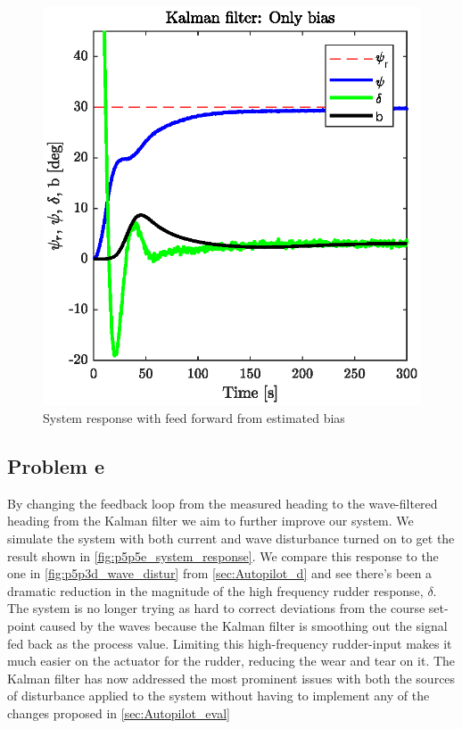 \begin{figure}[h]
	\centering
	\includegraphics[width=\textwidth]{figures/p5p5d.eps}
	\caption{System response with feed forward from estimated bias}
\label{fig:p5p5d_current_disturbance}
\end{figure}


\subsection{Problem e}

By changing the feedback loop from the measured heading to the wave-filtered heading from the Kalman filter we aim to further improve our system. We simulate the system with both current and wave disturbance turned on to get the result shown in \cref{fig:p5p5e_system_response}. We compare this response to the one in \cref{fig:p5p3d_wave_distur} from \cref{sec:Autopilot_d} and see there's been a dramatic reduction in the magnitude of the high frequency rudder response, $\delta$. The system is no longer trying as hard to correct deviations from the course set-point caused by the waves because the Kalman filter is smoothing out the signal fed back as the process value. Limiting this high-frequency rudder-input makes it much easier on the actuator for the rudder, reducing the wear and tear on it. The Kalman filter has now addressed the most prominent issues with both the sources of disturbance applied to the system without having to implement any of the changes proposed in \cref{sec:Autopilot_eval}

